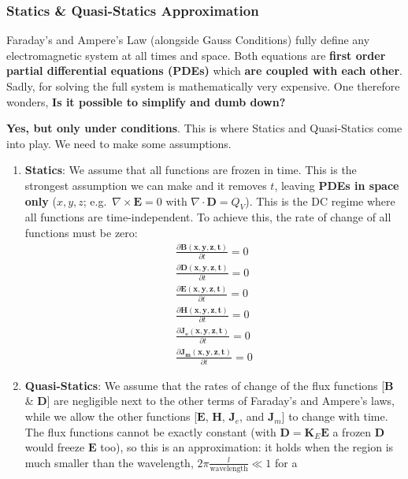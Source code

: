 \subsubsection{Statics \& Quasi-Statics Approximation}

Faraday's and Ampere's Law (alongside Gauss Conditions) fully define any electromagnetic system
at all times and space. Both equations are \textbf{first order partial differential
equations (PDEs)} which \textbf{are coupled with each other}. Sadly, for solving the
full system is mathematically very expensive. One therefore wonders, \textbf{Is it
possible to simplify and dumb down?}


\textbf{Yes, but only under conditions}. This is where Statics and Quasi-Statics
come into play. We need to make some assumptions.
\begin{enumerate}
  \item \textbf{Statics}: We assume that all functions are frozen in time. This is the
    strongest assumption we can make and it removes \(t\), leaving \textbf{PDEs in
    space only} (\(x, y, z\); e.g.\ \(\nabla \times \mathbf{E} = 0\) with \(\nabla \cdot \mathbf{D} = Q_V\)). This is the DC regime where all functions
    are time-independent. To achieve this, the rate of change of all functions must
    be zero:
    \begin{align*}
      \frac{\partial \mathbf{B(x,y,z,t)}}{\partial t} = 0 \\
      \frac{\partial \mathbf{D(x,y,z,t)}}{\partial t} = 0 \\
      \frac{\partial \mathbf{E(x,y,z,t)}}{\partial t} = 0 \\
      \frac{\partial \mathbf{H(x,y,z,t)}}{\partial t} = 0 \\
      \frac{\partial \mathbf{J_e(x,y,z,t)}}{\partial t} = 0 \\
      \frac{\partial \mathbf{J_m(x,y,z,t)}}{\partial t} = 0
    \end{align*}
  \item \textbf{Quasi-Statics}: We assume that the rates of change of the flux
    functions [\(\mathbf{B}\) \& \(\mathbf{D}\)] are negligible next to the other terms of
    Faraday's and Ampere's laws, while we allow the other functions
    [\(\mathbf{E}\), \(\mathbf{H}\), \(\mathbf{J}_e\), and \(\mathbf{J}_m\)] to change with time. The
    flux functions cannot be exactly constant (with \(\mathbf{D} = \mathbf{K}_E \mathbf{E}\) a frozen
    \(\mathbf{D}\) would freeze \(\mathbf{E}\) too), so this is an approximation: it holds when the
    region is much smaller than the wavelength, \(2\pi\frac{l}{\text{wavelength}} \ll 1\) for a

\end{enumerate}
